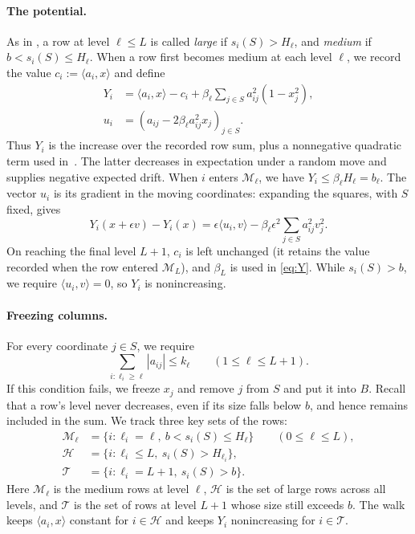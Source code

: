 \documentclass[reqno]{amsart}
\theoremstyle{definition}
\newcommand{\ip}[2]{\langle#1,#2\rangle}
\begin{document}
\paragraph{The potential.}
As in \cite{BJ}, a row at level $\ell\le L$ is called \emph{large} if $s_i(S)>H_\ell$, and \emph{medium} if $b<s_i(S)\le H_\ell$. When a row first becomes medium at each level $\ell$, we record the value $c_i:=\ip{a_i}{x}$ and define
\begin{equation}\label{eq:Y}
\begin{split}
  Y_i&=\ip{a_i}{x}-c_i +\beta_\ell\sum_{j\in S}a_{ij}^2(1-x_j^2),\\
  u_i&=(a_{ij}-2\beta_\ell a_{ij}^2x_j)_{j\in S}.
\end{split}
\end{equation}
Thus $Y_i$ is the increase over the recorded row sum, plus a nonnegative quadratic term used in~\cite{BJ}. The latter decreases in expectation under a random move and supplies negative expected drift. When $i$ enters $\mathcal M_\ell$, we have $Y_i\le\beta_\ell H_\ell=b_\ell$. The vector $u_i$ is its gradient in the moving coordinates: expanding the squares, with $S$ fixed, gives
\begin{equation}\label{eq:delta-Y} Y_i(x+\epsilon v)-Y_i(x) =\epsilon\ip{u_i}{v} -\beta_\ell\epsilon^2\sum_{j\in S}a_{ij}^2v_j^2. \end{equation}
On reaching the final level $L+1$, $c_i$ is left unchanged (it retains the value recorded when the row entered $\mathcal M_L$), and $\beta_L$ is used in \eqref{eq:Y}. While $s_i(S)>b$, we require $\ip{u_i}{v}=0$, so $Y_i$ is nonincreasing.


\paragraph{Freezing columns.}
For every coordinate $j\in S$, we require
\begin{equation}\label{eq:column-budgets} \sum_{i:\ell_i\ge\ell}|a_{ij}|\le k_\ell \qquad(1\le\ell\le L+1). \end{equation}
If this condition fails, we freeze $x_j$ and remove $j$ from $S$ and put it into $B$. Recall that a row's level never decreases, even if its size falls below $b$, and hence remains included in the sum. We track three key sets of the rows:
\[
\begin{split}
  \mathcal M_\ell&=\{i:\ell_i=\ell,\ b<s_i(S)\le H_\ell\} \qquad(0\le\ell\le L),\\
  \mathcal H&=\{i:\ell_i\le L,\ s_i(S)>H_{\ell_i}\},\\
  \mathcal T&=\{i:\ell_i=L+1,\ s_i(S)>b\}.
\end{split}
\]
Here $\mathcal M_\ell$ is the medium rows at level $\ell$, $\mathcal H$ is the set of large rows across all levels, and $\mathcal T$ is the set of rows at level $L+1$ whose size still exceeds $b$. The walk keeps $\langle a_i,x\rangle$ constant for $i\in\mathcal H$ and keeps $Y_i$ nonincreasing for $i\in\mathcal T$.
\end{document}
